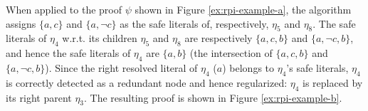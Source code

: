 \begin{example} %
\label{Example:Proof}
When applied to the proof $\psi$ shown in Figure \ref{ex:rpi-example-a}, the algorithm {\RPI} assigns $\{a,c\}$ and $\{a, \neg c\}$ as the safe literals of, respectively, $\eta_5$ and $\eta_8$. The safe literals of $\eta_4$ w.r.t. its children $\eta_5$ and $\eta_8$ are respectively $\{a,c,b\}$ and $\{a, \neg c, b\}$, and hence the safe literals of $\eta_4$ are $\{a,b\}$ (the intersection of $\{a,c,b\}$ and $\{a, \neg c, b\}$). Since the right resolved literal of $\eta_4$ ($a$) belongs to $\eta_4$'s safe literals, $\eta_4$ is correctly detected as a redundant node and hence regularized: $\eta_4$ is replaced by its right parent $\eta_3$. The resulting proof is shown in Figure \ref{ex:rpi-example-b}.




\end{example}

